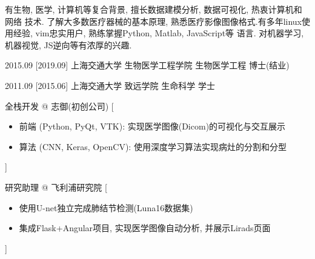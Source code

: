 \documentclass[zh]{resume}
\begin{document}
\makeheader

{\onehalfspacing\hspace{2em}%
有生物, 医学, 计算机等复合背景, 擅长数据建模分析, 数据可视化, 热衷计算机和网络
技术. 了解大多数医疗器械的基本原理, 熟悉医疗影像图像格式.有多年linux使用经验,
vim忠实用户, 熟练掌握Python, Matlab, JavaScript等 语言. 对机器学习, 机器视觉,
JS逆向等有浓厚的兴趣.
\par}

\begin{competences}
\end{competences}

\begin{educations}
  \education%
    {2015.09}%
    [2019.09]%
    {上海交通大学}%
    {生物医学工程学院}%
    {生物医学工程}%
    {博士(结业)}

  \separator{0.5ex}
  \education%
    {2011.09}%
    [2015.06]%
    {上海交通大学}%
    {致远学院}%
    {生命科学}%
    {学士}
\end{educations}


\begin{experiences}
    {全栈开发 @ 志御(初创公司)}%
    [\begin{itemize}
      \item{前端 (Python, PyQt, VTK): 实现医学图像(Dicom)的可视化与交互展示}
      \item{算法 (CNN, Keras, OpenCV):  使用深度学习算法实现病灶的分割和分型}
    \end{itemize}]

  \separator{0.5ex}
    { 研究助理 @ 飞利浦研究院}%
    [\begin{itemize}
      \item {使用U-net独立完成肺结节检测(Luna16数据集)}
      \item {集成Flask+Angular项目, 实现医学图像自动分析, 并展示Lirads页面}
    \end{itemize}]
\end{experiences}
\end{document}
